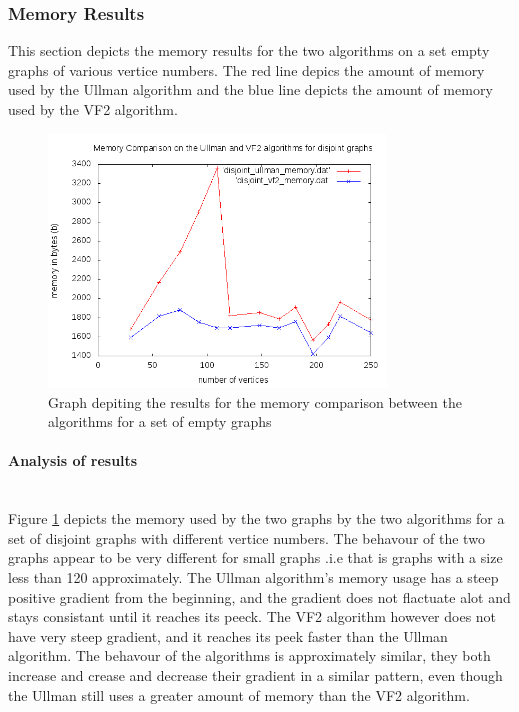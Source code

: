 \subsubsection{Memory Results}
This section depicts the memory results for the two algorithms on a set empty graphs of various vertice numbers. The red line depics the amount of memory
 used by the Ullman algorithm and the blue line depicts the amount of memory used by the VF2 algorithm.
\begin{figure}[H]
  \begin{center}
      \includegraphics[width=0.8\textwidth]{disjoint_memory.png}
  \end{center}    
  \caption{Graph depiting the results for the memory comparison between the algorithms for a set of empty graphs}
  \label{fig:disjoint_memory_comparison}
\end{figure}

\paragraph{Analysis of results}\mbox{}\\
Figure \ref{fig:disjoint_memory_comparison} depicts the memory used by the two graphs by the two algorithms for a set of disjoint graphs with different vertice 
numbers.\newline\newline
The behavour of the two graphs appear to be very different for small graphs .i.e that is graphs with a size less than 120 approximately. The Ullman algorithm's
memory usage has a steep positive gradient from the beginning, and the gradient does not flactuate alot and stays consistant until it reaches its peeck.
The VF2 algorithm however does not have very steep gradient, and it reaches its peek faster than the Ullman algorithm.\newline\newline
The behavour of the algorithms is approximately similar, they both increase and crease and decrease their gradient in a similar pattern, even though the Ullman
 still uses a greater amount of memory than the VF2 algorithm.
 
